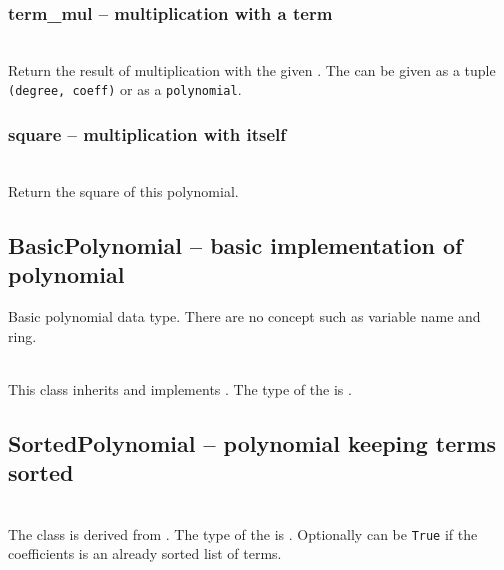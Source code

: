   \subsubsection{term\_mul -- multiplication with a term}
   \\
   \spacing
   Return the result of multiplication with the given .
   The  can be given as a tuple {\tt (degree, coeff)} or as a {\tt polynomial}.

   \subsubsection{square -- multiplication with itself}
   \\
   Return the square of this polynomial.

%
 \subsection{BasicPolynomial -- basic implementation of polynomial}
 Basic polynomial data type.
 There are no concept such as variable name and ring.

  \initialize
  \\
  \spacing
  \quad This class inherits and implements .
  \spacing
  \quad The type of the  is .

 \subsection{SortedPolynomial -- polynomial keeping terms sorted}
 \initialize
  \\
  The class is derived from .
  \spacing
  \quad The type of the  is .
  Optionally  can be {\tt True} if the coefficients is an
  already sorted list of terms.

